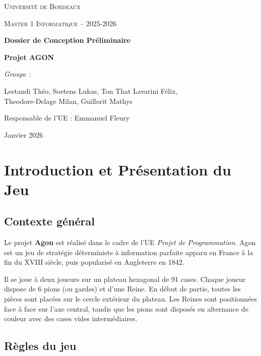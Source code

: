 \documentclass[9pt]{extarticle} %
\begin{document}
\begin{titlepage}
    \centering
    \vspace*{1cm}
    {\scshape\LARGE Université de Bordeaux \par}
    \vspace{1cm}
    {\scshape\Large Master 1 Informatique -- 2025-2026 \par}
    \vspace{2cm}
    {\huge\bfseries Dossier de Conception Préliminaire\par}
    \vspace{0.5cm}
    {\Large\bfseries Projet AGON \par}
    \vspace{2cm}
    {\Large\itshape Groupe :\par}
    Lestandi Théo, Soetens Lukas, Ton That Lavarini Félix, \\
    Theodore-Delage Milan, Guillorit Mathys \par
    \vfill
    {\large Responsable de l'UE : Emmanuel Fleury \par}
    {\large Janvier 2026 \par}
    
\end{titlepage}

\newpage
\tableofcontents
\newpage

\section{Introduction et Présentation du Jeu}

\subsection{Contexte général}
Le projet \textbf{Agon} est réalisé dans le cadre de l’UE \textit{Projet de Programmation}.  
Agon est un jeu de stratégie déterministe à information parfaite apparu en France à la fin du XVIII\ieme{} siècle, puis popularisé en Angleterre en 1842.  

Il se joue à deux joueurs sur un plateau hexagonal de 91 cases. Chaque joueur dispose de 6 pions (ou gardes) et d’une Reine. En début de partie, toutes les pièces sont placées sur le cercle extérieur du plateau. Les Reines sont positionnées face à face sur l’axe central, tandis que les pions sont disposés en alternance de couleur avec des cases vides intermédiaires.

\subsection{Règles du jeu}
\end{document}
